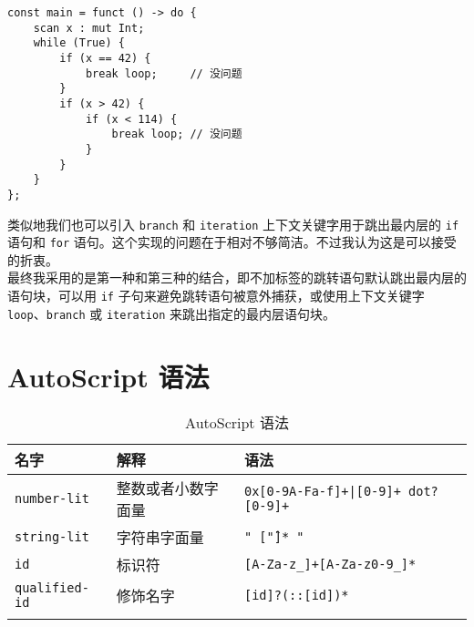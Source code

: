 \begin{lstlisting}
const main = funct () -> do {
	scan x : mut Int;
	while (True) {
		if (x == 42) {
			break loop;		// 没问题
		}
		if (x > 42) {
			if (x < 114) {
				break loop;	// 没问题
			}
		}
	}
};
\end{lstlisting}

类似地我们也可以引入 \lstinline!branch! 和 \lstinline!iteration! 上下文关键字用于跳出最内层的 \lstinline!if! 语句和 \lstinline!for! 语句。这个实现的问题在于相对不够简洁。不过我认为这是可以接受的折衷。 \\

最终我采用的是第一种和第三种的结合，即不加标签的跳转语句默认跳出最内层的语句块，可以用 \lstinline!if! 子句来避免跳转语句被意外捕获，或使用上下文关键字 \lstinline!loop!、\lstinline!branch! 或 \lstinline!iteration! 来跳出指定的最内层语句块。


\chapter{AutoScript 语法}

\begin{longtable}{l|p{5cm}|p{6cm}} \hline
	名字 & 解释 & 语法  \\\hline
	\texttt{number-lit} & 整数或者小数字面量 & \texttt{0x[0-9A-Fa-f]+|[0-9]+ dot? [0-9]+} \\\hline
	\texttt{string-lit} & 字符串字面量 & \texttt{" [\^"]* "} \\\hline
	\texttt{id} & 标识符 & \texttt{[A-Za-z\_]+[A-Za-z0-9\_]*} \\\hline
	\texttt{qualified-id} & 修饰名字 & \texttt{[id]?(::[id])*} \\\hline
	\caption{AutoScript 语法}
	\label{tab:grammar}
\end{longtable}